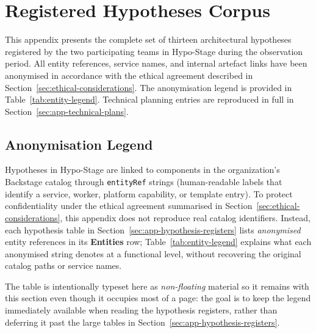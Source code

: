 

\chapter{Registered Hypotheses Corpus}
\label{app:hypotheses-corpus}

This appendix presents the complete set of thirteen architectural hypotheses
registered by the two participating teams in Hypo-Stage during the observation
period. All entity references, service names, and internal artefact links have
been anonymised in accordance with the ethical agreement described in
Section~\ref{sec:ethical-considerations}. The anonymisation legend is provided
in Table~\ref{tab:entity-legend}. Technical planning entries are reproduced in
full in Section~\ref{sec:app-technical-plans}.

\section{Anonymisation Legend}
\label{sec:app-legend}

Hypotheses in Hypo-Stage are linked to components in the organization's Backstage
catalog through \texttt{entityRef} strings (human-readable labels that identify a
service, worker, platform capability, or template entry). To protect confidentiality
under the ethical agreement summarised in Section~\ref{sec:ethical-considerations},
this appendix does not reproduce real catalog identifiers. Instead, each hypothesis
table in Section~\ref{sec:app-hypothesis-registers} lists \emph{anonymised} entity
references in its \textbf{Entities} row; Table~\ref{tab:entity-legend} explains what
each anonymised string denotes at a functional level, without recovering the original
catalog paths or service names.

The table is intentionally typeset here as \emph{non-floating} material so it remains
with this section even though it occupies most of a page: the goal is to keep the
legend immediately available when reading the hypothesis registers, rather than
deferring it past the large tables in Section~\ref{sec:app-hypothesis-registers}.

